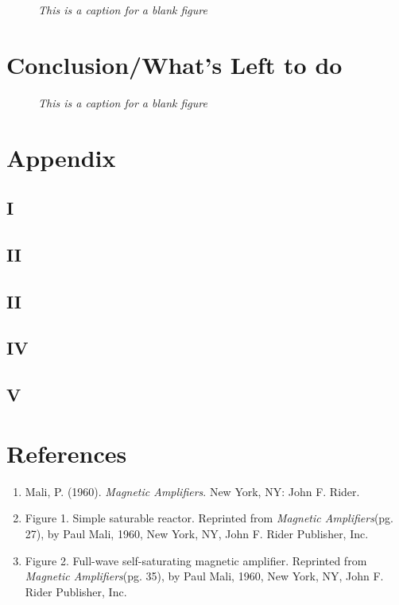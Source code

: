 \documentclass[11pt]{article}
\begin{document}
\blindtext

    \begin{figure}[H]
	\centering	
	\caption{\textit{This is a caption for a blank figure}}	
	\end{figure}



\section{Conclusion/What's Left to do}

\blindtext


     \begin{figure}[H]
	\centering	
	\caption{\textit{This is a caption for a blank figure}}	
	\end{figure}

\pagebreak

\section{Appendix}
\subsection{I}
\subsection{II}
\subsection{II}
\subsection{IV}
\subsection{V}	

\pagebreak

\section{References}
\begin{enumerate}
\item Mali, P. (1960).\textit{ Magnetic Amplifiers}. New York, NY: John F. Rider.
\item Figure 1. Simple saturable reactor. Reprinted from \textit{Magnetic Amplifiers}(pg. 27), by Paul Mali, 1960, New York, NY, John F. Rider Publisher, Inc.
\item Figure 2. Full-wave self-saturating magnetic amplifier. Reprinted from \textit{Magnetic Amplifiers}(pg. 35), by Paul Mali, 1960, New York, NY, John F. Rider Publisher, Inc.
\end{enumerate}	
\end{document}
